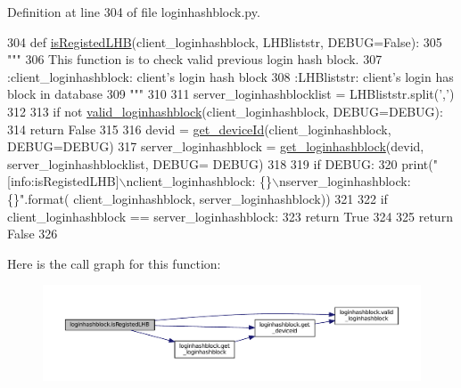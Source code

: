 Definition at line 304 of file loginhashblock.\+py.


\begin{DoxyCode}
304 \textcolor{keyword}{def }\hyperlink{namespaceloginhashblock_a978cb4557443cefddac883f3d92ad8e1}{isRegistedLHB}(client\_loginhashblock, LHBliststr, DEBUG=False):
305     \textcolor{stringliteral}{"""}
306 \textcolor{stringliteral}{    This function is to check valid previous login hash block.}
307 \textcolor{stringliteral}{    :client\_loginhashblock: client's login hash block}
308 \textcolor{stringliteral}{    :LHBliststr: client's login has block in database}
309 \textcolor{stringliteral}{    """}
310 
311     server\_loginhashblocklist = LHBliststr.split(\textcolor{stringliteral}{','})
312 
313     \textcolor{keywordflow}{if} \textcolor{keywordflow}{not} \hyperlink{namespaceloginhashblock_ac120dd8384bd51c357e2ad5f6cb2f99a}{valid\_loginhashblock}(client\_loginhashblock, DEBUG=DEBUG):
314         \textcolor{keywordflow}{return} \textcolor{keyword}{False}
315 
316     devid = \hyperlink{namespaceloginhashblock_a1908d7c90a7ea1a7f84eeac3a1378b57}{get\_deviceId}(client\_loginhashblock, DEBUG=DEBUG)
317     server\_loginhashblock = \hyperlink{namespaceloginhashblock_ab2ceb1d30aad9af290ac7d44e9f95bf2}{get\_loginhashblock}(devid, server\_loginhashblocklist, DEBUG=
      DEBUG)
318 
319     \textcolor{keywordflow}{if} DEBUG:
320         print(\textcolor{stringliteral}{"[info:isRegistedLHB]\(\backslash\)nclient\_loginhashblock: \{\}\(\backslash\)nserver\_loginhashblock: \{\}"}.format(
      client\_loginhashblock, server\_loginhashblock))
321 
322     \textcolor{keywordflow}{if} client\_loginhashblock == server\_loginhashblock:
323         \textcolor{keywordflow}{return} \textcolor{keyword}{True}
324 
325     \textcolor{keywordflow}{return} \textcolor{keyword}{False}
326 
\end{DoxyCode}


Here is the call graph for this function\+:
\nopagebreak
\begin{figure}[H]
\begin{center}
\leavevmode
\includegraphics[width=350pt]{namespaceloginhashblock_a978cb4557443cefddac883f3d92ad8e1_cgraph}
\end{center}
\end{figure}




